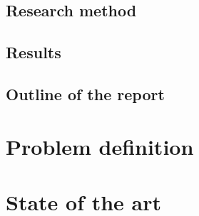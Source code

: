 \documentclass[11pt,twoside,a4paper]{report}
\begin{document}
\section{Research method}

\section{Results}

\section{Outline of the report}

\chapter{Problem definition}

\chapter{State of the art}
\end{document}
